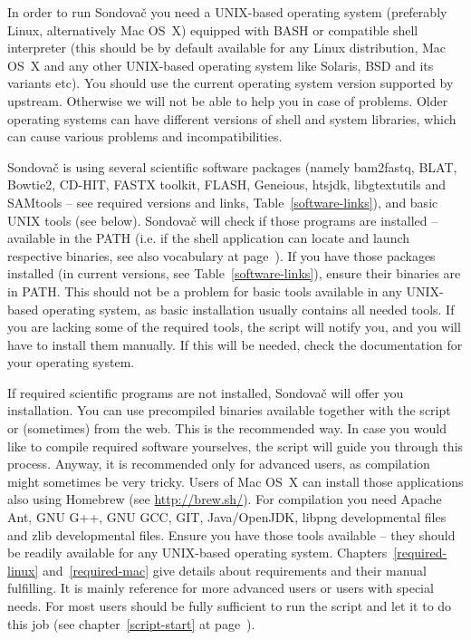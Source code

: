 \documentclass[a4paper, 11pt, twoside]{article}
\begin{document}
In order to run Sondovač you need a UNIX-based operating system (preferably Linux, alternatively Mac OS~X) equipped with BASH or compatible shell interpreter (this should be by default available for any Linux distribution, Mac OS~X and any other UNIX-based operating system like Solaris, BSD and its variants etc). You should use the current operating system version supported by upstream. Otherwise we will not be able to help you in case of problems. Older operating systems can have different versions of shell and system libraries, which can cause various problems and incompatibilities.

Sondovač is using several scientific software packages (namely bam2fastq, BLAT, Bowtie2, CD-HIT, FASTX toolkit, FLASH, Geneious, htsjdk, libgtextutils and SAMtools -- see required versions and links, Table~\ref{software-links}), and basic UNIX tools (see below). Sondovač will check if those programs are installed -- available in the PATH (i.e. if the shell application can locate and launch respective binaries, see also vocabulary at page~\pageref{vocabulary}). If you have those packages installed (in current versions, see Table~\ref{software-links}), ensure their binaries are in PATH. This should not be a problem for basic tools available in any UNIX-based operating system, as basic installation usually contains all needed tools. If you are lacking some of the required tools, the script will notify you, and you will have to install them manually. If this will be needed, check the documentation for your operating system. %

If required scientific programs are not installed, Sondovač will offer you installation. You can use precompiled binaries available together with the script or (sometimes) from the web. This is the recommended way. In case you would like to compile required software yourselves, the script will guide you through this process. Anyway, it is recommended only for advanced users, as compilation might sometimes be very tricky. Users of Mac OS~X can install those applications also using Homebrew (see \href{http://brew.sh/}{http://brew.sh/}). For compilation you need Apache Ant, GNU G++, GNU GCC, GIT, Java/OpenJDK, libpng developmental files and zlib developmental files. Ensure you have those tools available -- they should be readily available for any UNIX-based operating system. Chapters~\ref{required-linux} and~\ref{required-mac} give details about requirements and their manual fulfilling. It is mainly reference for more advanced users or users with special needs. For most users should be fully sufficient to run the script and let it to do this job (see chapter~\ref{script-start} at page~\pageref{script-usage}).
\end{document}
